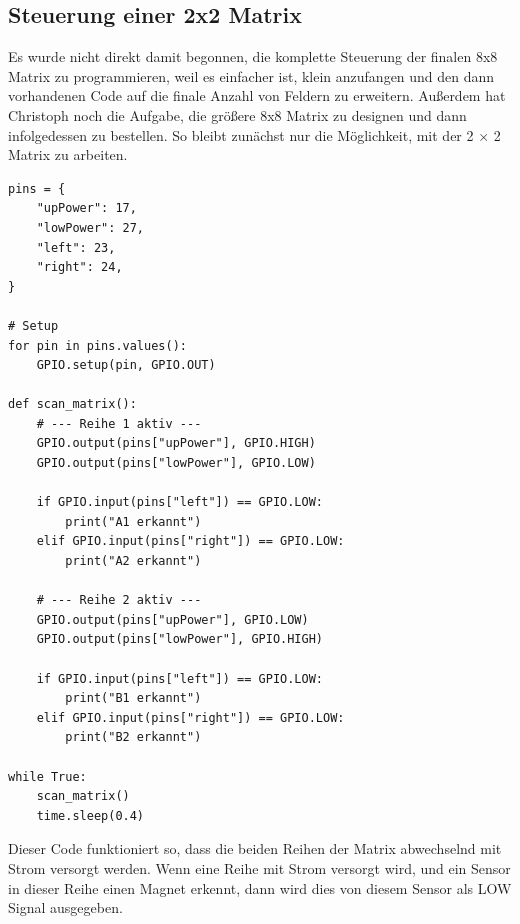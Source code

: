 
\graphicspath{{figures/}}
\renewcommand{\myauthor}{Maximilian Koch}
\lstset{
    language=Python,
    style=Python,
    numbers=left,
     numberstyle=\tiny,
    frame=tblr,
    tabsize=4,
    columns=fixed,
    showstringspaces=true,
    showtabs=false,
    keepspaces,
    captionpos=b,
}


\subsection{Steuerung einer 2x2 Matrix}
Es wurde nicht direkt damit begonnen, die komplette Steuerung der finalen 8x8 Matrix zu programmieren, 
weil es einfacher ist, klein anzufangen und den dann vorhandenen Code auf die finale Anzahl von Feldern zu 
erweitern. Außerdem hat Christoph noch die Aufgabe, die größere 8x8 Matrix zu designen und dann 
infolgedessen zu bestellen. So bleibt zunächst nur die Möglichkeit, mit der 2 × 2 Matrix zu arbeiten.\\

\begin{scriptsize}
\begin{lstlisting}[captionpos=b, caption={Erstes Beispiel für die Steuerung einer 2 × 2 Matrix}, label={lst:2x2matrix}]
pins = {
    "upPower": 17,
    "lowPower": 27,
    "left": 23,
    "right": 24,
}

# Setup
for pin in pins.values():
    GPIO.setup(pin, GPIO.OUT)

def scan_matrix():
    # --- Reihe 1 aktiv ---
    GPIO.output(pins["upPower"], GPIO.HIGH)
    GPIO.output(pins["lowPower"], GPIO.LOW)

    if GPIO.input(pins["left"]) == GPIO.LOW:
        print("A1 erkannt")
    elif GPIO.input(pins["right"]) == GPIO.LOW:
        print("A2 erkannt")

    # --- Reihe 2 aktiv ---
    GPIO.output(pins["upPower"], GPIO.LOW)
    GPIO.output(pins["lowPower"], GPIO.HIGH)

    if GPIO.input(pins["left"]) == GPIO.LOW:
        print("B1 erkannt")
    elif GPIO.input(pins["right"]) == GPIO.LOW:
        print("B2 erkannt")

while True:
    scan_matrix()
    time.sleep(0.4)
\end{lstlisting}
\end{scriptsize}


Dieser Code funktioniert so, dass die beiden Reihen der Matrix abwechselnd mit Strom versorgt werden. 
Wenn eine Reihe mit Strom versorgt wird, und ein Sensor in dieser Reihe einen Magnet erkennt, dann wird 
dies von diesem Sensor als LOW Signal ausgegeben.

